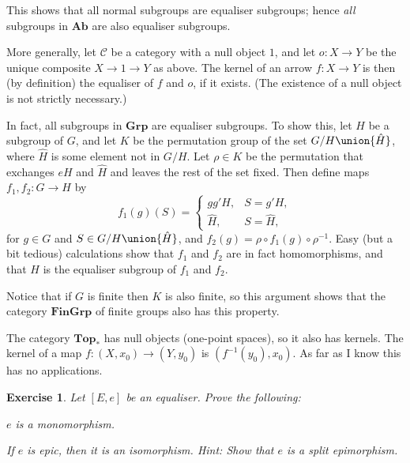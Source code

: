 \documentclass[article, a4paper, 11pt, oneside]{memoir}
\numberwithin{equation}{chapter}
\newcommand{\cat}[1]{\mathcal{#1}}
\newcommand{\ncat}[1]{\mathbf{#1}} %
\newcommand{\catTop}{\ncat{Top}}
\newcommand{\catGrp}{\ncat{Grp}}
\newcommand{\catAb}{\ncat{Ab}}
\newcommand{\catFinGrp}{\ncat{FinGrp}}
\newcommand{\catC}{\cat{C}}
\theoremstyle{myexample}
\newtheorem{exercise}[theorem]{Exercise}
\theoremstyle{myexamplebreak}
\begin{document}
\begin{examplebreak}
\begin{enumexample}
        This shows that all normal subgroups are equaliser subgroups; hence \emph{all} subgroups in $\catAb$ are also equaliser subgroups.

        More generally, let $\catC$ be a category with a null object $1$, and let $o \colon X \to Y$ be the unique composite $X \to 1 \to Y$ as above. The kernel of an arrow $f \colon X \to Y$ is then (by definition) the equaliser of $f$ and $o$, if it exists. (The existence of a null object is not strictly necessary.)

        \item \label{exam:equaliser_subgroup} In fact, all subgroups in $\catGrp$ are equaliser subgroups. To show this, let $H$ be a subgroup of $G$, and let $K$ be the permutation group of the set $G/H \union \{ \hat H \}$, where $\hat H$ is some element not in $G/H$. Let $\rho \in K$ be the permutation that exchanges $eH$ and $\hat H$ and leaves the rest of the set fixed. Then define maps $f_1, f_2 \colon G \to H$ by
        \begin{equation*}
            f_1(g)(S)
                =
                \begin{cases}
                    gg' H, & S = g' H, \\
                    \hat H, & S = \hat H,
                \end{cases}
        \end{equation*}
        for $g \in G$ and $S \in G/H \union \{ \hat H \}$, and $f_2(g) = \rho \circ f_1(g) \circ \rho^{-1}$. Easy (but a bit tedious) calculations show that $f_1$ and $f_2$ are in fact homomorphisms, and that $H$ is the equaliser subgroup of $f_1$ and $f_2$.

        Notice that if $G$ is finite then $K$ is also finite, so this argument shows that the category $\catFinGrp$ of finite groups also has this property.

        \item The category $\catTop_*$ has null objects (one-point spaces), so it also has kernels. The kernel of a map $f \colon (X, x_0) \to (Y, y_0)$ is $(f^{-1}(y_0), x_0)$. As far as I know this has no applications.
    \end{enumexample}
\end{examplebreak}


\begin{exercise}
    Let $[E, e]$ be an equaliser. Prove the following:
    \begin{enumexercise}
        \item $e$ is a monomorphism.
        
        \item If $e$ is epic, then it is an isomorphism. \emph{Hint:} Show that $e$ is a split epimorphism.
    \end{enumexercise}
\end{exercise}
\end{document}
